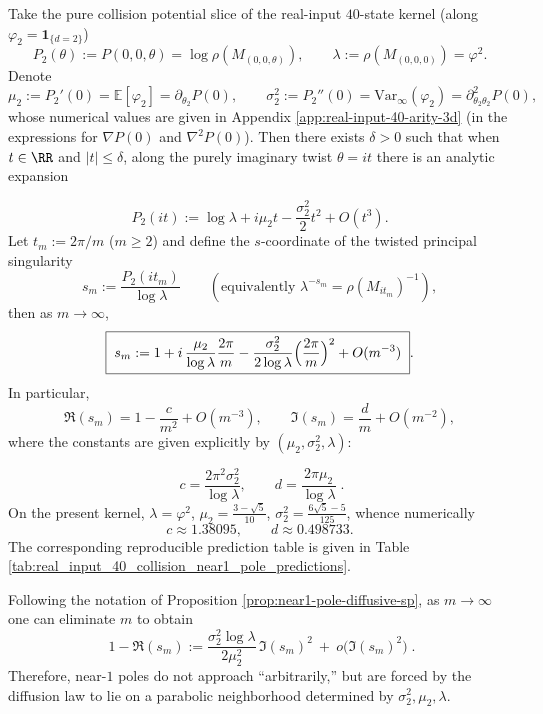 \begin{proposition}\label{prop:near1-pole-diffusive-sp}
Take the pure collision potential slice of the real-input \(40\)-state kernel (along \(\varphi_2=\mathbf{1}_{\{d=2\}}\))
\[
P_2(\theta):=P(0,0,\theta)=\log\rho(M_{(0,0,\theta)}),
\qquad \lambda:=\rho(M_{(0,0,0)})=\varphi^2.
\]
Denote
\[
\mu_2:=P_2'(0)=\mathbb{E}[\varphi_2]=\partial_{\theta_2}P(0),
\qquad
\sigma_2^2:=P_2''(0)=\mathrm{Var}_\infty(\varphi_2)=\partial_{\theta_2\theta_2}^2P(0),
\]
whose numerical values are given in Appendix \ref{app:real-input-40-arity-3d} (in the expressions for \(\nabla P(0)\) and \(\nabla^2P(0)\)).
Then there exists \(\delta>0\) such that when \(t\in\RR\) and \(|t|\le \delta\), along the purely imaginary twist \(\theta=it\) there is an analytic expansion

\[
P_2(it)
:=\log\lambda+i\mu_2 t-\frac{\sigma_2^2}{2}t^2+O(t^3).
\]
Let \(t_m:=2\pi/m\) (\(m\ge 2\)) and define the \(s\)-coordinate of the twisted principal singularity
\[
s_m:=\frac{P_2(it_m)}{\log\lambda}
\qquad(\text{equivalently } \lambda^{-s_m}=\rho(M_{it_m})^{-1}),
\]
then as \(m\to\infty\),
\[
\boxed{\;
s_m
:=1+i\,\frac{\mu_2}{\log\lambda}\frac{2\pi}{m}
-\frac{\sigma_2^2}{2\log\lambda}\Bigl(\frac{2\pi}{m}\Bigr)^2
+O(m^{-3})\; }.
\]
In particular,
\[
\Re(s_m)=1-\frac{c}{m^2}+O(m^{-3}),
\qquad
\Im(s_m)=\frac{d}{m}+O(m^{-2}),
\]
where the constants are given explicitly by \((\mu_2,\sigma_2^2,\lambda)\):

\[
\boxed{\;
c=\frac{2\pi^2\sigma_2^2}{\log\lambda},
\qquad
d=\frac{2\pi\mu_2}{\log\lambda}\; }.
\]
On the present kernel, \(\lambda=\varphi^2\), \(\mu_2=\frac{3-\sqrt5}{10}\), \(\sigma_2^2=\frac{6\sqrt5-5}{125}\), whence numerically
\[
c\approx 1.38095,
\qquad
d\approx 0.498733.
\]
The corresponding reproducible prediction table is given in Table \ref{tab:real_input_40_collision_near1_pole_predictions}.
\end{proposition}

\begin{corollary}\label{cor:near1-pole-parabola}
Following the notation of Proposition \ref{prop:near1-pole-diffusive-sp}, as \(m\to\infty\) one can eliminate \(m\) to obtain
\[
\boxed{\;
1-\Re(s_m)
:=\frac{\sigma_2^2\log\lambda}{2\mu_2^2}\,\Im(s_m)^2\ +\ o\!\bigl(\Im(s_m)^2\bigr)\; }.
\]
Therefore, near-\(1\) poles do not approach ``arbitrarily,'' but are forced by the diffusion law to lie on a parabolic neighborhood determined by \(\sigma_2^2,\mu_2,\lambda\).
\end{corollary}

